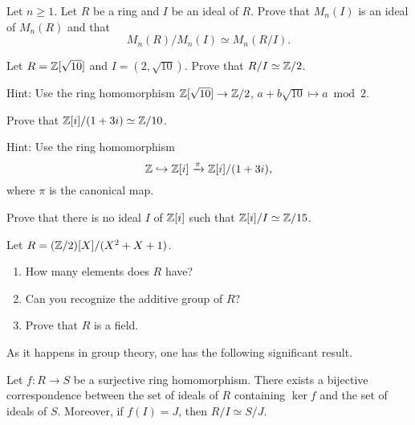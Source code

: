 \begin{exercise}
\label{xca:matrices}
	Let $n\geq1$. 
	Let $R$ be a ring and $I$ be an ideal of $R$. Prove that $M_n(I)$ is an ideal 
	of $M_n(R)$ and that 
    \[
    M_n(R)/M_n(I)\simeq M_n(R/I).
    \]
\end{exercise}

\begin{exercise}
    \label{xca:Z[sqrt10]/(2,sqrt10)}
    Let $R=\mathbb{Z}[\sqrt{10}]$ and $I=(2,\sqrt{10})$. Prove that $R/I\simeq\mathbb{Z}/2$. 	
\end{exercise}

Hint: Use the ring homomorphism $\mathbb{Z}[\sqrt{10}]\to\mathbb{Z}/2$, $a+b\sqrt{10}\mapsto a\bmod 2$. 	

\begin{exercise}
\label{xca:Z[i]/(1+3i)}
	Prove that $\mathbb{Z}[i]/(1+3i)\simeq\mathbb{Z}/10$. 	
\end{exercise}

Hint: Use 
the ring homomorphism 
\[
\mathbb{Z}\hookrightarrow\mathbb{Z}[i]\xrightarrow{\pi}\mathbb{Z}[i]/(1+3i),
\]
where
$\pi$ is the canonical map. 

\begin{exercise}
\label{xca:Z15}
	Prove that there is no ideal $I$ of $\mathbb{Z}[i]$ 
	such that $\mathbb{Z}[i]/I\simeq\mathbb{Z}/15$. 
\end{exercise}

\begin{exercise}
	Let $R=(\mathbb{Z}/2)[X]/(X^2+X+1)$. 
	\begin{enumerate}
		\item How many elements does $R$ have?
		\item Can you recognize the additive group of $R$?
		\item Prove that $R$ is a field. 	
	\end{enumerate}
\end{exercise}

As it happens in group theory, one has the following significant result. 

\begin{theorem}
\label{thm:ring_correspondence}
	Let $f\colon R\to S$ be a surjective ring homomorphism. There exists a
	bijective correspondence between 
	the set of ideals of $R$ containing $\ker f$ and
	the set of ideals of $S$.  Moreover, if $f(I)=J$, then
	$R/I\simeq S/J$. 
\end{theorem}


